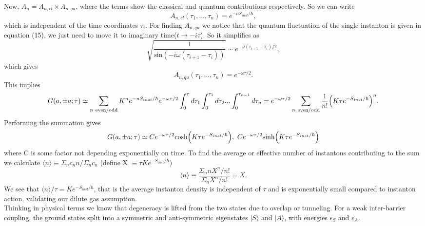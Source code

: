 \documentclass[a4paper, 12pt]{article}
\begin{document}
Now, $A_n = A_{n,cl} \times A_{n,qu} $, where the terms show the classical and quantum contributions respectively. So we can write
\begin{equation}
A_{n,cl}(\tau_1,...,\tau_n) = e^{-nS_{inst}/\hbar},
\end{equation}
which is independent of the time coordinates $\tau_i$. For finding $ A_{n,qu} $ we notice that the quantum fluctuation of the single instanton is given in equation (15), we just need to move it to imaginary time($t \to -i\tau$). So it simplifies as
\begin{equation}
\sqrt{\frac{1}{\mathrm{sin}(-i\omega(\tau_{i+1}-\tau_{i}))}} \sim e^{-\omega(\tau_{i+1}-\tau_{i})/2},
\end{equation}
which gives
\begin{equation}
A_{n,qu}(\tau_1,...,\tau_n) = e^{-\omega\tau /2}.
\end{equation}
This implies
\begin{dmath}
G(a,\pm a; \tau) \simeq \sum_{n\*\ \mathrm{even/odd}}K^n e^{-nS_{inst}/\hbar}e^{-\omega\tau /2}\int_0^{\tau}d\tau_1 \int_0^{\tau_1}d\tau_2 ... \int_0^{\tau_{n-1}}d\tau_n  = e^{-\omega\tau /2} \sum_{n\*\ \mathrm{even/odd}}\frac{1}{n!}\Big(K \tau e^{-S_{inst}/\hbar}\Big)^n .
\end{dmath}
Performing the summation gives
\begin{dmath}
G(a,\pm a; \tau) \simeq Ce^{-\omega\tau /2} \mathrm{cosh}\Big(K \tau e^{-S_{inst}/\hbar}\Big),
\\ \*\ Ce^{-\omega\tau /2} \mathrm{sinh}\Big(K \tau e^{-S_{inst}/\hbar}\Big)
\end{dmath}
where C is some factor not depending exponentially on time. To find the average or effective number of instantons contributing to the sum we calculate $\langle n \rangle \equiv \Sigma_n c_n n/ \Sigma_n c_n$ (define X $\equiv \tau K e^{-S_{inst}/\hbar}$)
\begin{equation}
\langle n \rangle \equiv \frac{\Sigma_n nX^n/n!}{\Sigma_n X^n/n!} = X.
\end{equation}
We see that $\langle n \rangle /\tau = K e^{-S_{inst}/\hbar}$, that is the average instanton density is independent of $\tau$ and is exponentially small compared to instanton action, validating our dilute gas assumption.\\
Thinking in physical terms we know that degeneracy is lifted from the two states due to overlap or tunneling. For a weak inter-barrier coupling, the ground states split into a symmetric and anti-symmetric eigenstates $|S\rangle$ and $|A \rangle$, with energies $\epsilon_S$ and $\epsilon_A$.
\end{document}
